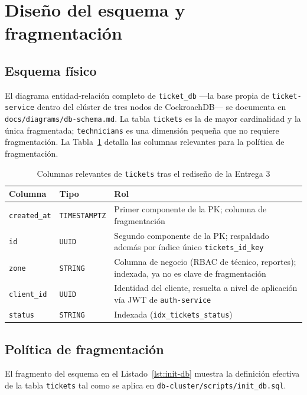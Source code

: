 \documentclass[11pt,letterpaper]{article}
\begin{document}
\section{Diseño del esquema y fragmentación}
\label{sec:diseno-esquema}

\subsection{Esquema físico}

El diagrama entidad-relación completo de \texttt{ticket\_db} —la base propia de
\texttt{ticket-service} dentro del clúster de tres nodos de CockroachDB— se documenta en
\texttt{docs/diagrams/db-schema.md}. La tabla \texttt{tickets} es la de mayor cardinalidad y la
única fragmentada; \texttt{technicians} es una dimensión pequeña que no requiere fragmentación. La
Tabla~\ref{tab:esquema-tickets} detalla las columnas relevantes para la política de fragmentación.

\begin{table}[H]
\centering
\caption{Columnas relevantes de \texttt{tickets} tras el rediseño de la Entrega 3}
\label{tab:esquema-tickets}
\begin{tabular}{@{}llp{6.5cm}@{}}
\toprule
\textbf{Columna} & \textbf{Tipo} & \textbf{Rol} \\
\midrule
\texttt{created\_at} & \texttt{TIMESTAMPTZ} & Primer componente de la PK; columna de fragmentación \\
\texttt{id}           & \texttt{UUID}        & Segundo componente de la PK; respaldado además por índice único \texttt{tickets\_id\_key} \\
\texttt{zone}         & \texttt{STRING}      & Columna de negocio (RBAC de técnico, reportes); indexada, ya no es clave de fragmentación \\
\texttt{client\_id}   & \texttt{UUID}        & Identidad del cliente, resuelta a nivel de aplicación vía JWT de \texttt{auth-service} \\
\texttt{status}       & \texttt{STRING}      & Indexada (\texttt{idx\_tickets\_status}) \\
\bottomrule
\end{tabular}
\end{table}

\subsection{Política de fragmentación}

El fragmento del esquema en el Listado~\ref{lst:init-db} muestra la definición efectiva de la
tabla \texttt{tickets} tal como se aplica en \texttt{db-cluster/scripts/init\_db.sql}.
\end{document}
